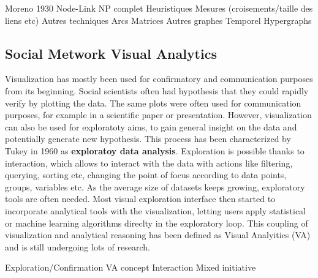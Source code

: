 Moreno 1930
Node-Link
    NP complet
    Heuristiques
    Mesures (croisements/taille des liens etc)
Autres techniques
    Arcs
    Matrices
Autres graphes
    Temporel
    Hypergraphs


\subsection{Social Metwork Visual Analytics}

Visualization has mostly been used for confirmatory and communication purposes from its beginning.
Social scientists often had hypothesis that they could rapidly verify by plotting the data.
The same plots were often used for communication purposes, for example in a scientific paper or presentation.
However, visualization can also be used for exploratoty aims, to gain general insight on the data and potentially generate new hypothesis.
This process has been characterized by Tukey in 1960 as \textbf{exploratoy data analysis}.
Exploration is possible thanks to interaction, which allows to interact with the data with actions like filtering, querying, sorting etc, changing the point of focus according to data points, groups, variables etc.
As the average size of datasets keeps growing, exploratory tools are often needed.
Most visual exploration interface then started to incorporate analytical tools with the visualization, letting users apply statistical or machine learning algorithms direclty in the exploratory loop. This coupling of visualization and analytical reasoning has been defined as Visual Analyitics (VA) and is still undergoing lots of research.




Exploration/Confirmation
VA concept
Interaction
Mixed initiative










